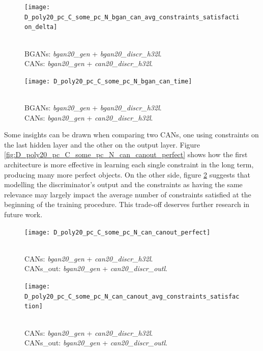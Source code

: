 \begin{figure}[ht]
    \centering
    \begin{minipage}[t]{0.45\textwidth}
        \centering
        \texttt{[image: D\_poly20\_pc\_C\_some\_pc\_N\_bgan\_can\_avg\_constraints\_satisfaction\_delta]}
        \caption{\\BGANs: \textit{bgan20\_gen} + \textit{bgan20\_discr\_h32l}.\\
        CANs: \textit{bgan20\_gen} + \textit{can20\_discr\_h32l}.}
        \label{fig:D_poly20_pc_C_some_pc_N_bgan_can_avg_constraints_satisfaction_delta}
    \end{minipage}
    \hfill
    \begin{minipage}[t]{0.45\textwidth}
        \centering
        \texttt{[image: D\_poly20\_pc\_C\_some\_pc\_N\_bgan\_can\_time]}
        \caption{\\BGANs: \textit{bgan20\_gen} + \textit{bgan20\_discr\_h32l}.\\CANs: \textit{bgan20\_gen} + \textit{can20\_discr\_h32l}.}
        \label{fig:D_poly20_pc_C_some_pc_N_bgan_can_time}
    \end{minipage}
\end{figure}


Some insights can be drawn when comparing two CANs, one using constraints on the last hidden layer and the other on the output layer. Figure \ref{fig:D_poly20_pc_C_some_pc_N_can_canout_perfect} shows how the first architecture is more effective in learning each single constraint in the long term, producing many more perfect objects. On the other side, figure \ref{fig:D_poly20_pc_C_some_pc_N_can_canout_avg_constraints_satisfaction} suggests that modelling the discriminator's output and the constraints as having the same relevance may largely impact the average number of constraints satisfied at the beginning of the training procedure. This trade-off deserves further research in future work.

\begin{figure}[ht]
    \centering
    \begin{minipage}[t]{0.45\textwidth}
        \centering
        \texttt{[image: D\_poly20\_pc\_C\_some\_pc\_N\_can\_canout\_perfect]}
        \caption{\\CANs: \textit{bgan20\_gen} + \textit{can20\_discr\_h32l}.\\
        CANs\_out: \textit{bgan20\_gen} + \textit{can20\_discr\_outl}.}
        \label{fig:D_poly20_pc_C_some_pc_N_can_canout_perfect}
    \end{minipage}
    \hfill
    \begin{minipage}[t]{0.45\textwidth}
        \centering
        \texttt{[image: D\_poly20\_pc\_C\_some\_pc\_N\_can\_canout\_avg\_constraints\_satisfaction]}
        \caption{\\CANs: \textit{bgan20\_gen} + \textit{can20\_discr\_h32l}.\\
        CANs\_out: \textit{bgan20\_gen} + \textit{can20\_discr\_outl}.}
        \label{fig:D_poly20_pc_C_some_pc_N_can_canout_avg_constraints_satisfaction}
    \end{minipage}
\end{figure}


